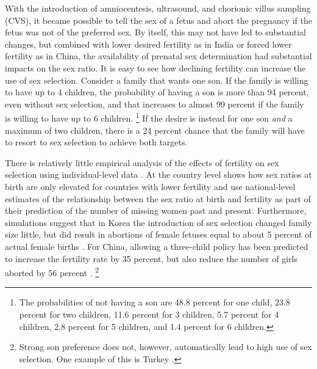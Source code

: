 \documentclass[letterpaper,12pt]{article}
\begin{document}
With the introduction of amniocentesis, ultrasound, and chorionic villus
sampling (CVS), it became possible to tell the sex of a fetus and abort
the pregnancy if the fetus was not of the preferred sex. 
By itself, this may not have led to substantial changes, but combined
with lower desired fertility as in India or forced lower fertility as in
China, the availability of prenatal sex determination had substantial
impacts on the sex ratio. 
It is easy to see how declining fertility can increase the use of sex
selection. 
Consider a family that wants one son. 
If the family is willing to have up to 4 children, the probability of
having a son is more than 94 percent, even without sex selection, and
that increases to almost 99 percent if the family is willing to have up
to 6 children.%
\footnote{
The probabilities of not having a son are 48.8 percent for one child,
23.8 percent for two children, 11.6 percent for 3 children, 5.7 percent
for 4 children, 2.8 percent for 5 children, and 1.4 percent for 6
children.} 
If the desire is instead for one son \emph{and} a maximum of two
children, there is a 24 percent chance that the family will have to
resort to sex selection to achieve both targets.

There is relatively little empirical analysis of the effects of
fertility on sex selection using individual-level data
\citep{park95,Ebenstein2011}. 
At the country level \citet{Bongaarts2013} shows how sex ratios at birth
are only elevated for countries with lower fertility and
\citet{Bongaarts2015} use national-level estimates of the relationship
between the sex ratio at birth and fertility as part of their prediction
of the number of missing women past and present. 
Furthermore, simulations suggest that in Korea the introduction of sex
selection changed family size little, but did result in abortions of
female fetuses equal to about 5 percent of actual female births
\citep{park95}. 
For China, allowing a three-child policy has been predicted to increase
the fertility rate by 35 percent, but also reduce the number of girls
aborted by 56 percent \citep{Ebenstein2011}.%
\footnote{
Strong son preference does not, however, automatically lead to high use
of sex selection. 
One example of this is Turkey \citep{Altindag2016}.}
\end{document}
